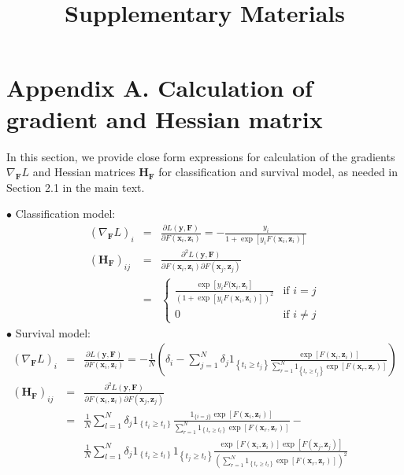 \documentclass[a4paper,12pt]{article}
\title{
	\vspace{4in}
	\textmd{\bf Supplementary Materials}\\
	\vspace{3in}
}
\date{}
\newcommand{\bd}[1]{\mathbf{#1}}
\newcommand{\grad}[2]{\nabla_{\bd{#2}} #1}
\newcommand{\hess}[1]{\bd{H}_{\bd{#1}}}
\begin{document}
	\maketitle
	\thispagestyle{empty}
	\newpage
	\setcounter{page}{1}
	\section*{Appendix A. Calculation of gradient and Hessian matrix} \label{sec:calcu}
	In this section, we provide close form expressions for calculation of the gradients $\grad{L}{F}$ and Hessian matrices $\hess{F}$ for classification and survival model, as needed in Section 2.1 in the main text.
	
	\noindent $\bullet$ Classification model:
	\begin{eqnarray*}
		(\grad{L}{F})_i & = & \frac{\partial L(\bd{y}, \bd{F})}{\partial F(\bd{x}_i, \bd{z}_i)} = -\frac{y_i}{1+\exp[y_i F(\bd{x}_i, \bd{z}_i)]} \\
		(\hess{F})_{ij} & = & \frac{\partial^2 L(\bd{y}, \bd{F})}{\partial F(\bd{x}_i, \bd{z}_i) \partial F(\bd{x}_j, \bd{z}_j)} \\
		& = & \begin{cases}
			\frac{\exp[y_iF(\bd{x}_i, \bd{z}_i]}{(1+\exp[y_iF(\bd{x}_i, \bd{z}_i)])^2} &\text{if  $i = j$}\\
			0 &\text{if $i \neq j$}
		\end{cases}
	\end{eqnarray*}
	\noindent $\bullet$ Survival model:
	\begin{eqnarray*}
		(\grad{L}{F})_i &=&   \frac{\partial L(\bd{y}, \bd{F})}{\partial F(\bd{x}_i, \bd{z}_i)}  = -\frac{1}{N}\left( \delta_i - \sum^N_{j=1}\delta_j1_{\left\lbrace t_i \geq t_j\right\rbrace }\frac{\exp[F(\bd{x}_i, \bd{z}_i)]}{\sum^N_{r=1}1_{\left\lbrace t_r \geq t_j \right\rbrace }\exp[F(\bd{x}_r, \bd{z}_r)]}\right) \\
		(\hess{F})_{ij} & = & \frac{\partial^2 L(\bd{y}, \bd{F})}{\partial F(\bd{x}_i, \bd{z}_i) \partial F(\bd{x}_j, \bd{z}_j)} \\
		& = &  \frac{1}{N} \sum^N_{l=1}\delta_j 1_{\left\lbrace t_i \geq t_l\right\rbrace }  \frac{1_{\{ i = j\}}\exp[F(\bd{x}_i, \bd{z}_i)]}{ \sum^N_{r=1}1_{\left\lbrace t_r \geq t_l \right\rbrace }\exp[F(\bd{x}_r, \bd{z}_r)]} - \\
		& & \frac{1}{N} \sum^N_{l=1}\delta_j 1_{\left\lbrace t_i \geq t_l\right\rbrace } 1_{\left\lbrace t_j \geq t_l \right\rbrace }\frac{\exp[F(\bd{x}_i, \bd{z}_i)]\exp[F(\bd{x}_j, \bd{z}_j)]}{\left( \sum^N_{r=1}1_{\left\lbrace t_r \geq t_l \right\rbrace }\exp[F(\bd{x}_r, \bd{z}_r)]\right) ^2} 
	\end{eqnarray*}
	
\end{document}
